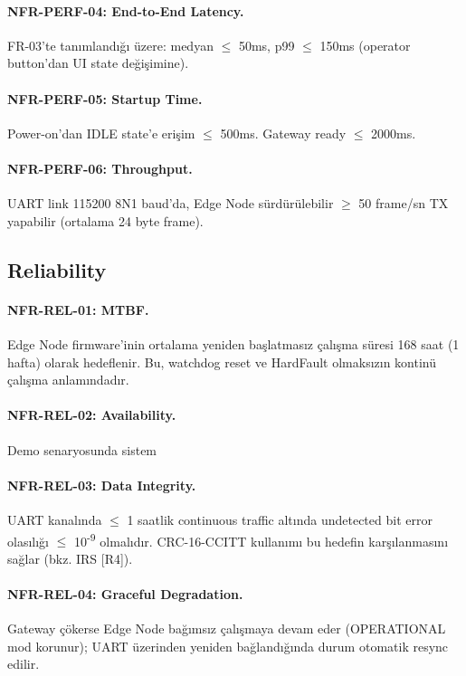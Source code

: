 \paragraph{NFR-PERF-04: End-to-End Latency.}
FR-03'te tanımlandığı üzere: medyan $\leq$ 50ms, p99 $\leq$ 150ms (operator button'dan UI state değişimine).

\paragraph{NFR-PERF-05: Startup Time.}
Power-on'dan IDLE state'e erişim $\leq$ 500ms. Gateway ready $\leq$ 2000ms.

\paragraph{NFR-PERF-06: Throughput.}
UART link 115200 8N1 baud'da, Edge Node sürdürülebilir $\geq$ 50 frame/sn TX yapabilir (ortalama 24 byte frame).

\subsection{Reliability}

\paragraph{NFR-REL-01: MTBF.}
Edge Node firmware'inin ortalama yeniden başlatmasız çalışma süresi 168 saat (1 hafta) olarak hedeflenir. Bu, watchdog reset ve HardFault olmaksızın kontinü çalışma anlamındadır.

\paragraph{NFR-REL-02: Availability.}
Demo senaryosunda sistem %

\paragraph{NFR-REL-03: Data Integrity.}
UART kanalında $\leq$ 1 saatlik continuous traffic altında undetected bit error olasılığı $\leq$ 10\textsuperscript{-9} olmalıdır. CRC-16-CCITT kullanımı bu hedefin karşılanmasını sağlar (bkz. IRS [R4]).

\paragraph{NFR-REL-04: Graceful Degradation.}
Gateway çökerse Edge Node bağımsız çalışmaya devam eder (OPERATIONAL mod korunur); UART üzerinden yeniden bağlandığında durum otomatik resync edilir.

